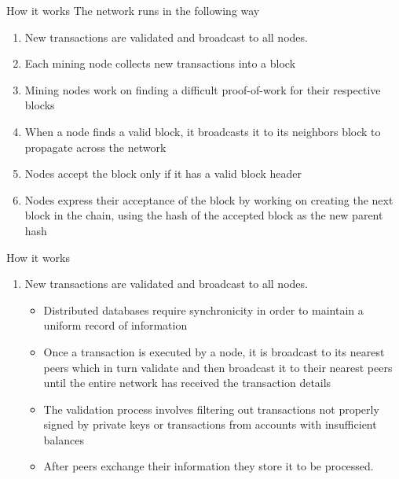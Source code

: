 \documentclass[9pt]{beamer}
\begin{document}

\begin{frame}{How it works}
	The network runs in the following way
	\begin{enumerate}
		\item New transactions are validated and broadcast to all nodes.
		\item Each mining node collects new transactions into a block
		\item Mining nodes work on finding a difficult proof-of-work for their respective blocks
		\item When a node finds a valid block, it broadcasts it to its neighbors block to propagate across the network
		\item Nodes accept the block only if it has a valid block header
		\item Nodes express their acceptance of the block by working on creating the next block in the chain, using the hash of the accepted block as the new parent hash
	\end{enumerate}
\end{frame}


\begin{frame}{How it works}
	\begin{enumerate}
		\item New transactions are validated and broadcast to all nodes.
			\begin{itemize}
				\item Distributed databases require synchronicity in order to maintain a uniform record of information
				\item Once a transaction is executed by a node, it is broadcast to its nearest peers which in turn validate and then broadcast it to their nearest peers until the entire network has received the transaction details
				\item The validation process involves filtering out transactions not properly signed by private keys or transactions from accounts with insufficient balances
				\item After peers exchange their information they store it to be processed.
			\end{itemize}
	\end{enumerate}
\end{frame}

\end{document}
